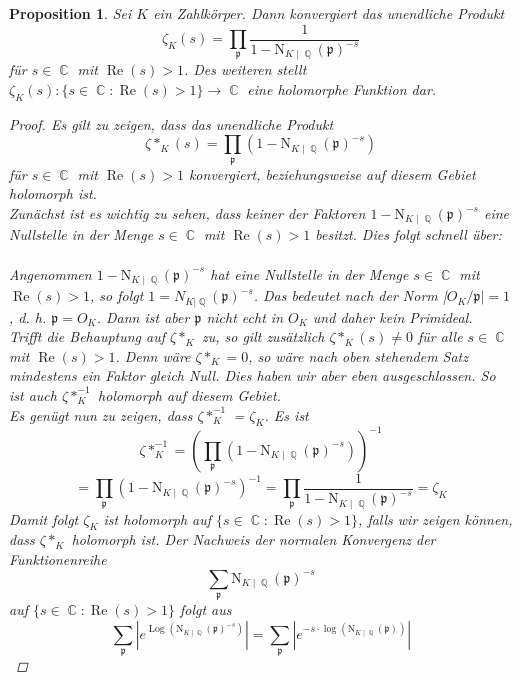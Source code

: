\documentclass[10pt,a4paper]{article}
\theoremstyle{plain}
\newtheorem{prop}[thm]{Proposition}
\theoremstyle{definition}
\theoremstyle{remark}
\DeclareMathOperator{\C}{\mathbb{C}}
\DeclareMathOperator{\Q}{\mathbb{Q}}
\DeclareMathOperator{\re}{Re}
\DeclareMathOperator{\Log}{Log}
\begin{document}
\begin{prop}

Sei $\textit{K}$ ein Zahlkörper. Dann konvergiert das unendliche Produkt $$\zeta_{\textit{K}} (\textit{s})= \prod_{\mathfrak{p}}\frac{1}{1-\mathrm{N}_{K \mid \Q}(\mathfrak{p})^{-s}}$$ für $s \in \C $ mit $ \re(s) > 1$. Des weiteren stellt $\zeta_{K}(s)\colon \{ s \in \C \colon \re(s)>1\} \rightarrow \C$ eine holomorphe Funktion dar.

\begin{proof}\label{proofprop14}
Es gilt zu zeigen, dass das unendliche Produkt
$$\zeta*_{\textit{K}} (\textit{s})= \prod_{\mathfrak{p}}(1-\mathrm{N}_{K \mid \Q}(\mathfrak{p})^{-s})$$ für $s \in \C $ mit $\re(s) > 1$ konvergiert, beziehungsweise auf diesem Gebiet holomorph ist.\\
Zunächst ist es wichtig zu sehen, dass keiner der Faktoren $1-\mathrm{N}_{K \mid \Q}(\mathfrak{p})^{-s}$ eine Nullstelle in der Menge $s \in \C $ mit $\re(s) > 1$ besitzt. Dies folgt schnell über: \\
\\
Angenommen $1-\mathrm{N}_{K \mid \Q}(\mathfrak{p})^{-s}$ hat eine Nullstelle in der Menge  $s \in \C $ mit \\$ \re(s) > 1$, so folgt $1 = N_{K|\Q}(\mathfrak{p})^{-s}$. Das bedeutet nach der Norm |$O_K /\mathfrak{p}| = 1$, d. h. $\mathfrak{p} = O_K$. Dann ist aber $\mathfrak{p}$ nicht echt in $O_K$ und daher kein Primideal. \\
Trifft die Behauptung auf $\zeta*_{K}$ zu, so gilt zusätzlich $\zeta*_{\textit{K}} (\textit{s}) \neq 0$ für alle  $s \in \C $ mit $ \re(s) > 1$. Denn wäre  $\zeta*_{K} = 0$, so wäre nach oben stehendem Satz mindestens ein Faktor gleich Null. Dies haben wir aber eben ausgeschlossen. So ist auch  $\zeta*_{K}^{-1}$ holomorph auf diesem Gebiet. \\Es genügt nun zu zeigen, dass 
$\zeta*_{K}^{-1}$ = $\zeta_{K}$. Es ist $$\zeta*_{K}^{-1}=(\prod_{\mathfrak{p}}(1 - \mathrm{N}_{K\mid\Q}(\mathfrak{p})^{-s}))^{-1} $$ $$=\prod_{\mathfrak{p}}(1 - \mathrm{N}_{K\mid\Q}(\mathfrak{p})^{-s})^{-1} = \prod_{\mathfrak{p}}\frac{1}{1 - \mathrm{N}_{K\mid\Q}(\mathfrak{p})^{-s}}=\zeta_{K}$$
Damit folgt $\zeta_{K}$ ist holomorph auf $\{ s \in \C \colon \re(s) > 1\}$, falls wir zeigen können, dass $\zeta*_K$ holomorph ist. Der Nachweis der normalen Konvergenz der Funktionenreihe $$\sum_{\mathfrak{p}}\mathrm{N}_{K\mid\Q}(\mathfrak{p})^{-s}$$ auf $\{ s \in \C \colon \re(s) > 1\}$ folgt aus $$\sum_{\mathfrak{p}}|e^{\Log(\mathrm{N}_{K\mid \Q}(\mathfrak{p})^{-s})}| = \sum_{\mathfrak{p}}|e^{-s\cdot \log(\mathrm{N}_{K\mid \Q}(\mathfrak{p}))}|$$

\end{proof}
\end{prop}
\end{document}
